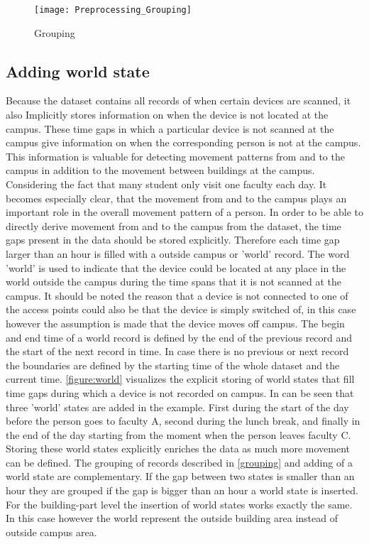 \begin{figure}[H]
\centering
\texttt{[image: Preprocessing\_Grouping]}
\captionsetup{justification=centering}
\caption{Grouping}
\label{figure:grouping}
\end{figure}

\subsection{Adding world state}\label{addingWorld}
Because the dataset contains all records of when certain devices are scanned, it also Implicitly stores information on when the device is not located at the campus. These time gaps in which a particular device is not scanned at the campus give information on when the corresponding person is not at the campus. This information is valuable for detecting movement patterns from and to the campus in addition to the movement between buildings at the campus. Considering the fact that many student only visit one faculty each day. It becomes especially clear, that the movement from and to the campus plays an important role in the overall movement pattern of a person. In order to be able to directly derive movement from and to the campus from the dataset, the time gaps present in the data should be stored explicitly. Therefore each time gap larger than an hour is filled with a outside campus or 'world' record. The word 'world' is used to indicate that the device could be located at any place in the world outside the campus during the time spans that it is not scanned at the campus. It should be noted the reason that a device is not connected to one of the access points could also be that the device is simply switched of, in this case however the assumption is made that the device moves off campus. The begin and end time of a world record is defined by the end of the previous record and the start of the next record in time. In case there is no previous or next record the boundaries are defined by the starting time of the whole dataset and the current time. \autoref{figure:world} visualizes the explicit storing of world states that fill time gaps during which a device is not recorded on campus. In can be seen that three 'world' states are added in the example. First during the start of the day before the person goes to faculty A, second during the lunch break, and finally in the end of the day starting from the moment when the person leaves faculty C. Storing these world states explicitly enriches the data as much more movement can be defined. The grouping of records described in \autoref{grouping} and adding of a world state are complementary. If the gap between two states is smaller than an hour they are grouped if the gap is bigger than an hour a world state is inserted. For the building-part level the insertion of world states works exactly the same. In this case however the world represent the outside building area instead of outside campus area.


